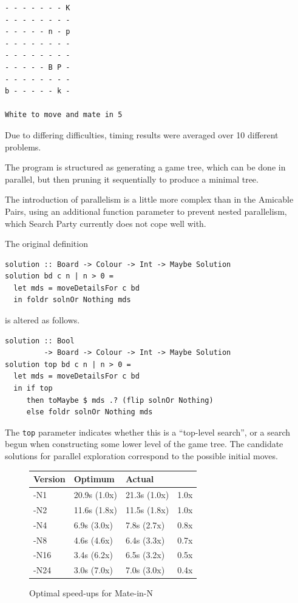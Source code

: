 \begin{verbatim}
- - - - - - - K 
- - - - - - - - 
- - - - - n - p 
- - - - - - - - 
- - - - - - - - 
- - - - - B P - 
- - - - - - - - 
b - - - - - k - 

White to move and mate in 5
\end{verbatim}

Due to differing difficulties, timing results were averaged over 10
different problems.

The program is structured as generating a game tree, which can be done
in parallel, but then pruning it sequentially to produce a minimal
tree.

The introduction of parallelism is a little more complex than in the
Amicable Pairs, using an additional function parameter to prevent
nested parallelism, which Search Party currently does not cope well
with.

The original definition

\begin{verbatim}
solution :: Board -> Colour -> Int -> Maybe Solution
solution bd c n | n > 0 = 
  let mds = moveDetailsFor c bd
  in foldr solnOr Nothing mds
\end{verbatim}

\noindent is altered as follows.

\begin{verbatim}
solution :: Bool
         -> Board -> Colour -> Int -> Maybe Solution
solution top bd c n | n > 0 = 
  let mds = moveDetailsFor c bd
  in if top
     then toMaybe $ mds .? (flip solnOr Nothing)
     else foldr solnOr Nothing mds
\end{verbatim}

The \verb|top| parameter indicates whether this is a ``top-level
search'', or a search begun when constructing some lower level of the
game tree. The candidate solutions for parallel exploration correspond
to the possible initial moves.

\begin{figure}[t]
  \centering
  \begin{tabularx}{\linewidth}{|X|X|X|X|}
    \hline \textbf{Version} & \textbf{Optimum} & \textbf{Actual} & \\
    \hline -N1  & 20.9s (1.0x) & 21.3s (1.0x) & 1.0x \\
           -N2  & 11.6s (1.8x) & 11.5s (1.8x) & 1.0x \\
           -N4  & 6.9s (3.0x)  & 7.8s (2.7x)  & 0.8x \\
           -N8  & 4.6s (4.6x)  & 6.4s (3.3x)  & 0.7x \\
           -N16 & 3.4s (6.2x)  & 6.5s (3.2x)  & 0.5x \\
           -N24 & 3.0s (7.0x)  & 7.0s (3.0x)  & 0.4x \\
    \hline
  \end{tabularx}
  \caption{Optimal speed-ups for Mate-in-N}
  \label{fig:searchparty-examples-mate-amdahl}
\end{figure}

